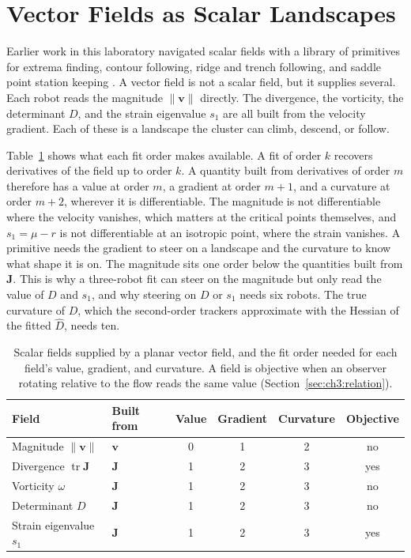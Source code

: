 \section{Vector Fields as Scalar Landscapes}
\label{sec:ch8:scalar}

Earlier work in this laboratory navigated scalar fields with a library of
primitives for extrema finding, contour following, ridge and trench
following, and saddle point station keeping \cite{3}. A vector field
is not a scalar field, but it supplies several. Each robot reads the
magnitude $\lVert\mathbf{v}\rVert$ directly. The divergence, the
vorticity, the determinant $D$, and the strain eigenvalue $s_1$ are all
built from the velocity gradient. Each of these is a landscape the
cluster can climb, descend, or follow.

Table~\ref{tab:ch8:scalar} shows what each fit order makes available. A
fit of order $k$ recovers derivatives of the field up to order $k$. A
quantity built from derivatives of order $m$ therefore has a value at
order $m$, a gradient at order $m + 1$, and a curvature at order $m + 2$,
wherever it is differentiable. The magnitude is not differentiable where
the velocity vanishes, which matters at the critical points themselves,
and $s_1 = \mu - r$ is not differentiable at an isotropic point, where
the strain vanishes. A primitive needs the gradient to steer on a landscape and the curvature
to know what shape it is on. The magnitude sits one order below the
quantities built from $\mathbf{J}$. This is why a three-robot fit can
steer on the magnitude but only read the value of $D$ and $s_1$, and why
steering on $D$ or $s_1$ needs six robots. The true curvature of $D$,
which the second-order trackers approximate with the Hessian of the
fitted $\hat{D}$, needs ten.

\begin{table}[htbp]
\centering
\caption{Scalar fields supplied by a planar vector field, and the fit
order needed for each field's value, gradient, and curvature. A field is
objective when an observer rotating relative to the flow reads the same
value (Section~\ref{sec:ch3:relation}).}
\label{tab:ch8:scalar}
\begin{tabular}{llcccc}
\hline
Field & Built from & Value & Gradient & Curvature & Objective \\
\hline
Magnitude $\lVert\mathbf{v}\rVert$ & $\mathbf{v}$ & 0 & 1 & 2 & no \\
Divergence $\operatorname{tr}\mathbf{J}$ & $\mathbf{J}$ & 1 & 2 & 3 & yes \\
Vorticity $\omega$ & $\mathbf{J}$ & 1 & 2 & 3 & no \\
Determinant $D$ & $\mathbf{J}$ & 1 & 2 & 3 & no \\
Strain eigenvalue $s_1$ & $\mathbf{J}$ & 1 & 2 & 3 & yes \\
\hline
\end{tabular}
\end{table}

